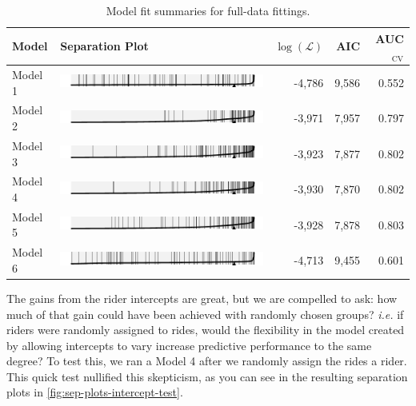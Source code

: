 \documentclass[]{article}
\begin{document}
\begin{table}[htb]
\centering
\caption{Model fit summaries for full-data fittings.\label{tab:modelfits}}
\begin{tabular}{lm{4in}rrr}
\toprule
\textbf{Model} & \textbf{Separation Plot} & \textbf{$\log (\mathcal{L})$} & \textbf{AIC} &
\textbf{AUC}$_{\text{CV}}$\footnotemark\\
\midrule
Model 1 & \includegraphics{figure/model1-sep.pdf}
& -4,786 & 9,586 & 0.552\\
Model 2 & \includegraphics{figure/model2-sep.pdf}
& -3,971 & 7,957 & 0.797\\
Model 3 & \includegraphics{figure/model3-sep.pdf}
& -3,923 & 7,877 & 0.802\\
Model 4 & \includegraphics{figure/model4-sep.pdf}
& -3,930 & 7,870 & 0.802\\
Model 5 & \includegraphics{figure/model5-sep.pdf}
& -3,928 & 7,878 & 0.803\\
Model 6 & \includegraphics{figure/model6-sep.pdf}
& -4,713 & 9,455 & 0.601\\
\bottomrule
\end{tabular}
\end{table}


The gains from the rider intercepts are great, but we are compelled to
ask: how much of that gain could have been achieved with randomly chosen
groups? \textit{i.e.} if riders were randomly assigned to rides, would
the flexibility in the model created by allowing intercepts to vary
increase predictive performance to the same degree? To test this, we ran
a Model 4 after we randomly assign the rides a rider. This quick test
nullified this skepticism, as you can see in the resulting separation
plots in \autoref{fig:sep-plots-intercept-test}.
\end{document}
